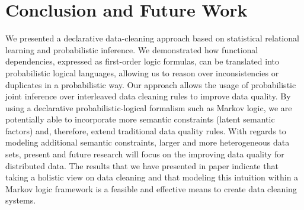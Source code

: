 
\section{Conclusion and Future Work}
\label{sec:conclusion}
We presented a declarative data-cleaning approach based on statistical relational learning and probabilistic inference. 
We demonstrated how functional dependencies, expressed as first-order logic formulas, can be translated into probabilistic logical languages, allowing us to reason over inconsistencies or duplicates in a probabilistic way. Our approach allows the usage of probabilistic joint inference over interleaved data cleaning rules to improve data quality. By using a declarative probabilistic-logical formalism such as Markov logic, we are potentially able to incorporate more semantic constraints (latent semantic factors) and, therefore, extend traditional data quality rules. With regards to modeling additional semantic constraints, larger and more heterogeneous data sets, present and future research will focus on the improving data quality for distributed data. The results that we have presented in paper indicate that taking a holistic view on data cleaning and that modeling this intuition within a Markov logic framework is a feasible and effective means to create data cleaning systems. 